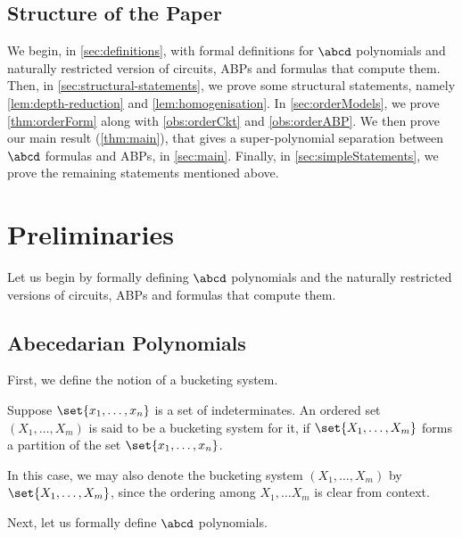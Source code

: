 \subsection{Structure of the Paper}

We begin, in \autoref{sec:definitions}, with formal definitions for $\abcd$ polynomials and naturally restricted version of circuits, ABPs and formulas that compute them.
Then, in \autoref{sec:structural-statements}, we prove some structural statements, namely \autoref{lem:depth-reduction} and \autoref{lem:homogenisation}.
In \autoref{sec:orderModels}, we prove \autoref{thm:orderForm} along with \autoref{obs:orderCkt} and \autoref{obs:orderABP}.
We then prove our main result (\autoref{thm:main}), that gives a super-polynomial separation between $\abcd$ formulas and ABPs, in \autoref{sec:main}.
Finally, in \autoref{sec:simpleStatements}, we prove the remaining statements mentioned above.

%

\section{Preliminaries}\label{sec:definitions}

Let us begin by formally defining $\abcd$ polynomials and the naturally restricted versions of circuits, ABPs and formulas that compute them.

\subsection{Abecedarian Polynomials}\label{sec:defn_abcd_poly}

First, we define the notion of a bucketing system.

\begin{definition}
	Suppose $\set{x_1, \ldots, x_n}$ is a set of indeterminates.
	An ordered set $(X_1, \ldots, X_m)$ is said to be a bucketing system for it, if $\set{X_1, \ldots, X_m}$ forms a partition of the set $\set{x_1, \ldots, x_n}$.

	In this case, we may also denote the bucketing system $(X_1, \ldots, X_m)$ by $\set{X_1, \ldots, X_m}$, since the ordering among $X_1, \ldots X_m$ is clear from context.	
\end{definition}

\noindent Next, let us formally define $\abcd$ polynomials. 

